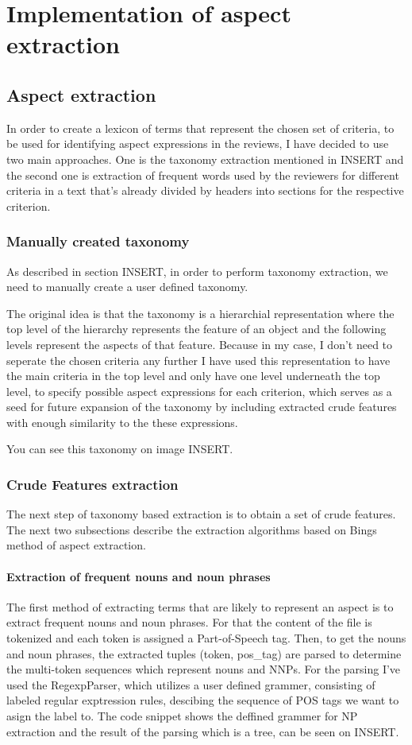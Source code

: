 \chapter{Implementation of aspect extraction}
\section{Aspect extraction}
In order to create a lexicon of terms that represent the chosen set of criteria, to be used for identifying aspect expressions in the reviews, I have decided to use two main approaches. One is the taxonomy extraction mentioned in INSERT and the second one is extraction of frequent words used by the reviewers for different criteria in a text that's already divided by headers into sections for the respective criterion.
\subsection{Manually created taxonomy}
As described in section INSERT, in order to perform taxonomy extraction, we need to manually
create a user defined taxonomy. 

The original idea is that the taxonomy is a hierarchial representation where the top level of the hierarchy represents the feature of an object and the following levels represent the aspects of that feature. Because in my case, I don't need to seperate the chosen criteria any further I have used this representation to have the main criteria in the top level and only have one level underneath the top level, to specify possible aspect expressions for each criterion, which serves as a seed for future expansion of the taxonomy by including extracted crude features with enough similarity to the these expressions. 

You can see this taxonomy on image INSERT.
\subsection{Crude Features extraction}
The next step of taxonomy based extraction is to obtain a set of crude features. The next two subsections describe the extraction algorithms based on Bings method of aspect extraction.

\subsubsection{Extraction of frequent nouns and noun phrases}
The first method of extracting terms that are likely to represent an aspect is to extract frequent nouns and noun phrases. For that the content of the file is tokenized and each token is assigned a Part-of-Speech tag. Then, to get the nouns and noun phrases, the extracted tuples (token, pos\_tag) are parsed to determine the multi-token sequences which represent nouns and NNPs. For the parsing I've used the RegexpParser, which utilizes a user defined grammer, consisting of labeled regular exptression rules, descibing the sequence of POS tags we want to asign the label to. The code snippet shows the deffined grammer for NP extraction and the result of the parsing which is a tree, can be seen on INSERT.

